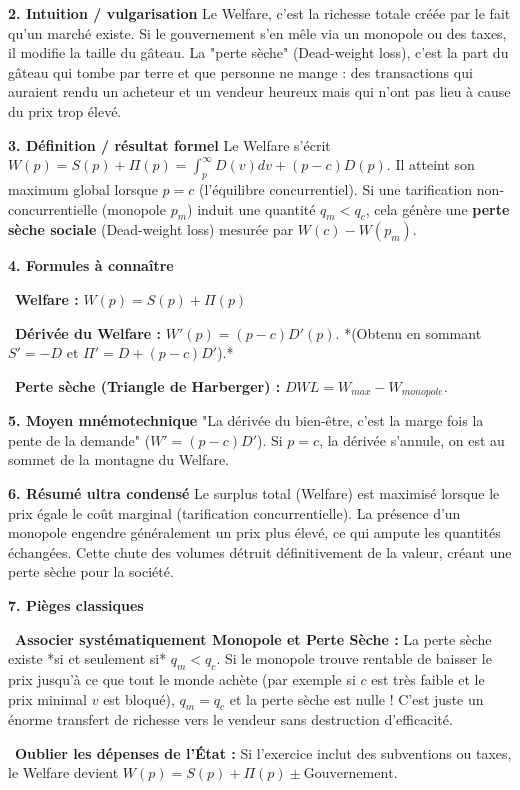\documentclass[11pt, a4paper]{report}
\begin{document}
\textbf{2. Intuition / vulgarisation}
Le Welfare, c'est la richesse totale créée par le fait qu'un marché existe. Si le gouvernement s'en mêle via un monopole ou des taxes, il modifie la taille du gâteau. La "perte sèche" (Dead-weight loss), c'est la part du gâteau qui tombe par terre et que personne ne mange : des transactions qui auraient rendu un acheteur et un vendeur heureux mais qui n'ont pas lieu à cause du prix trop élevé.

\textbf{3. Définition / résultat formel}
Le Welfare s'écrit $W(p) = S(p) + \Pi(p) = \int_p^\infty D(v) dv + (p-c)D(p)$.
Il atteint son maximum global lorsque $p = c$ (l'équilibre concurrentiel).
Si une tarification non-concurrentielle (monopole $p_m$) induit une quantité $q_m < q_c$, cela génère une \textbf{perte sèche sociale} (Dead-weight loss) mesurée par $W(c) - W(p_m)$.

\textbf{4. Formules à connaître}
\par \textbullet\ \textbf{Welfare :} $W(p) = S(p) + \Pi(p)$
\par \textbullet\ \textbf{Dérivée du Welfare :} $W'(p) = (p-c)D'(p)$. *(Obtenu en sommant $S'=-D$ et $\Pi' = D + (p-c)D'$).*
\par \textbullet\ \textbf{Perte sèche (Triangle de Harberger) :} $DWL = W_{max} - W_{monopole}$. 

\textbf{5. Moyen mnémotechnique}
"La dérivée du bien-être, c'est la marge fois la pente de la demande" ($W' = (p-c)D'$). Si $p=c$, la dérivée s'annule, on est au sommet de la montagne du Welfare.

\textbf{6. Résumé ultra condensé}
Le surplus total (Welfare) est maximisé lorsque le prix égale le coût marginal (tarification concurrentielle). La présence d'un monopole engendre généralement un prix plus élevé, ce qui ampute les quantités échangées. Cette chute des volumes détruit définitivement de la valeur, créant une perte sèche pour la société.

\textbf{7. Pièges classiques}
\par \textbullet\ \textbf{Associer systématiquement Monopole et Perte Sèche :} La perte sèche existe *si et seulement si* $q_m < q_c$. Si le monopole trouve rentable de baisser le prix jusqu'à ce que tout le monde achète (par exemple si $c$ est très faible et le prix minimal $v$ est bloqué), $q_m = q_c$ et la perte sèche est nulle ! C'est juste un énorme transfert de richesse vers le vendeur sans destruction d'efficacité.
\par \textbullet\ \textbf{Oublier les dépenses de l'État :} Si l'exercice inclut des subventions ou taxes, le Welfare devient $W(p) = S(p) + \Pi(p) \pm \text{Gouvernement}$.
\end{document}
